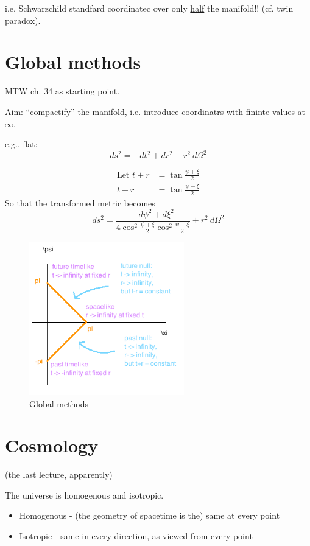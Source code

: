 \documentclass[a4paper]{article} %
\begin{document}
i.e. Schwarzchild standfard coordinatec over only \underline{half} the manifold!! (cf. twin paradox).

\section{Global methods}
MTW ch. 34 as starting point.

Aim: ``compactify'' the manifold, i.e. introduce coordinatrs with fininte values at $\infty$.

e.g., flat: 
\begin{equation}
ds^2 = -dt^2 + dr^2 + r^2~d\Omega^2
\end{equation}

\begin{align}
\text{Let } t+r&=\tan\frac{\psi+\xi}{2}\\
t-r&= \tan \frac{\psi-\xi}{2}
\end{align}
So that the transformed metric becomes
\begin{equation}
ds^2=\frac{-d\psi^2 + d\xi^2}{4\cos^2\frac{\psi+\xi}{2}\cos^2\frac{\psi-\xi}{2}}+r^2~d\Omega^2
\end{equation}

\begin{figure}[h]
\centering
\includegraphics[width=0.6\textwidth]{images/global-methods.png}
\caption{Global methods}
\end{figure}

\section{Cosmology}
(the last lecture, apparently)

The universe is homogenous and isotropic.

\begin{itemize}
\item Homogenous - (the geometry of spacetime is the) same at every point
\item Isotropic - same in every direction, as viewed from every point
\end{itemize}
\end{document}
